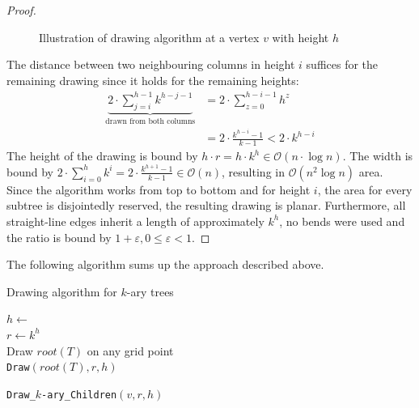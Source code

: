 \begin{proof}
\begin{figure}[H]
\begin{subfigure}{\textwidth}
		\end{subfigure}
	\caption{Illustration of drawing algorithm at a vertex $v$ with height $h$}\label{im:k-ary_trees_algorithm_illustration}
\end{figure}
	The distance between two neighbouring columns in height $i$ suffices for the remaining drawing since it holds for the remaining heights:
	\begin{align}
		\underbrace{2\cdot \sum_{j=i}^{h-1} k^{h-j-1}}_{\text{drawn from both columns}} &= 2\cdot\sum_{z = 0}^{h-i-1}h^z\\
		&= 2\cdot\frac{k^{h-i}-1}{k-1} < 2\cdot k^{h-i}
	\end{align}
	The height of the drawing is bound by $h\cdot r = h\cdot k^h \in \mathcal{O}(n\cdot \log n)$. 
	The width is bound by $2\cdot\sum_{i = 0}^{h} k^i = 2\cdot \frac{k^{h+1}-1}{k-1} \in \mathcal{O}(n)$, resulting in $\mathcal{O}(n^2\log n)$ area.\\ 
	Since the algorithm works from top to bottom and for height $i$, the area for every subtree is disjointedly reserved, the resulting drawing is planar. Furthermore, all straight-line edges inherit a length of approximately $k^h$, no bends were used and the ratio is bound by $1+\varepsilon, 0\leq \varepsilon<1$.
\end{proof}
\bigskip
The following algorithm sums up the approach described above.\\
\begin{algorithm}[H]
	\caption{Drawing algorithm for $k$-ary trees}\label{al:k-ary_trees}
	$h \gets $ \\
	$r \gets k^h$\\
	Draw $root(T)$ on any grid point\\
	\texttt{Draw}$(root(T),r,h)$
\end{algorithm}
\begin{algorithm}[H]
	\caption{\texttt{Draw\_$k$-ary\_Children}$(v,r,h)$}
\end{algorithm}


